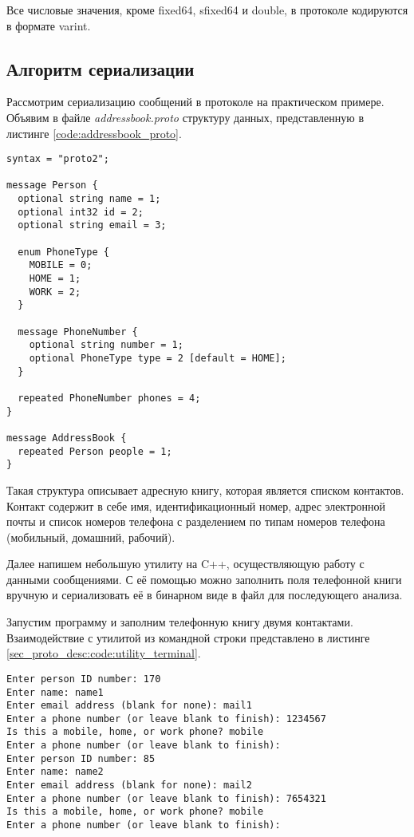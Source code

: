 Все числовые значения, кроме fixed64, sfixed64 и double, в протоколе кодируются в формате varint.

\subsection{Алгоритм сериализации}

Рассмотрим сериализацию сообщений в протоколе на практическом примере. Объявим в файле \textit{addressbook.proto} 
структуру данных, представленную в листинге \ref{code:addressbook_proto}.

\noindent\begin{minipage}{\linewidth}
\begin{lstlisting}[style=CodeListing, label=code:addressbook_proto, caption={Protobuf-сообщения AddressBook и Person}]
syntax = "proto2";

message Person {
  optional string name = 1;
  optional int32 id = 2;
  optional string email = 3;

  enum PhoneType {
    MOBILE = 0;
    HOME = 1;
    WORK = 2;
  }

  message PhoneNumber {
    optional string number = 1;
    optional PhoneType type = 2 [default = HOME];
  }

  repeated PhoneNumber phones = 4;
}

message AddressBook {
  repeated Person people = 1;
}
\end{lstlisting}
\end{minipage}

Такая структура описывает адресную книгу, которая является списком контактов.
Контакт содержит в себе имя, идентификационный номер, адрес электронной почты и список номеров
телефона с разделением по типам номеров телефона (мобильный, домашний, рабочий).

Далее напишем небольшую утилиту на C++, осуществляющую работу с данными сообщениями. С её помощью можно заполнить поля телефонной книги вручную и сериализовать её в бинарном виде в файл для последующего анализа.

Запустим программу и заполним телефонную книгу двумя контактами. Взаимодействие с утилитой из командной строки представлено в листинге \ref{sec_proto_desc:code:utility_terminal}.

\noindent\begin{minipage}{\linewidth}
\begin{lstlisting}[style=CodeListing, caption={Взаимодействие с утилитой для заполнения и сериализации сообщений}, label=sec_proto_desc:code:utility_terminal]
Enter person ID number: 170
Enter name: name1
Enter email address (blank for none): mail1
Enter a phone number (or leave blank to finish): 1234567
Is this a mobile, home, or work phone? mobile
Enter a phone number (or leave blank to finish):
Enter person ID number: 85
Enter name: name2
Enter email address (blank for none): mail2
Enter a phone number (or leave blank to finish): 7654321
Is this a mobile, home, or work phone? mobile
Enter a phone number (or leave blank to finish):
\end{lstlisting}
\end{minipage}

